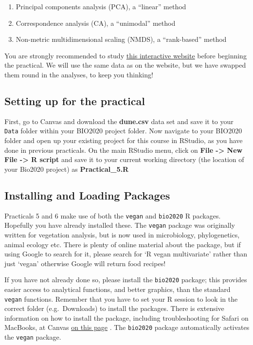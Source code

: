 \documentclass[
]{article}
\providecommand{\tightlist}{%
  \setlength{\itemsep}{0pt}\setlength{\parskip}{0pt}}
\begin{document}
\begin{enumerate}
\def\labelenumi{\arabic{enumi}.}
\tightlist
\item
  Principal components analysis (PCA), a ``linear'' method
\item
  Correspondence analysis (CA), a ``unimodal'' method
\item
  Non-metric multidimensional scaling (NMDS), a ``rank-based'' method
\end{enumerate}

You are strongly recommended to study
\href{https://naturalandenvironmentalscience.shinyapps.io/Unconstrained/}{this
interactive website} before beginning the practical. We will use the
same data as on the website, but we have swapped them round in the
analyses, to keep you thinking!

\hypertarget{setting-up-for-the-practical}{%
\subsection{Setting up for the
practical}\label{setting-up-for-the-practical}}

First, go to Canvas and download the \textbf{dune.csv} data set and save
it to your \texttt{Data} folder within your BIO2020 project folder. Now
navigate to your BIO2020 folder and open up your existing project for
this course in RStudio, as you have done in previous practicals. On the
main RStudio menu, click on \textbf{File -\textgreater{} New File
-\textgreater{} R script} and save it to your current working directory
(the location of your Bio2020 project) as \textbf{Practical\_5.R}

\hypertarget{installing-and-loading-packages}{%
\subsection{Installing and Loading
Packages}\label{installing-and-loading-packages}}

Practicals 5 and 6 make use of both the \texttt{vegan} and
\texttt{bio2020} R packages. Hopefully you have already installed these.
The \texttt{vegan} package was originally written for vegetation
analysis, but is now used in microbiology, phylogenetics, animal ecology
etc. There is plenty of online material about the package, but if using
Google to search for it, please search for `R vegan multivariate' rather
than just `vegan' otherwise Google will return food recipes!

If you have not already done so, please install the \texttt{bio2020}
package; this provides easier access to analytical functions, and better
graphics, than the standard \texttt{vegan} functions. Remember that you
have to set your R session to look in the correct folder
(e.g.~Downloads) to install the packages. There is extensive information
on how to install the package, including troubleshooting for Safari on
MacBooks, at Canvas
\href{https://ncl.instructure.com/courses/23926/pages/3-install-additional-r-packages}{on
this page} . The \texttt{bio2020} package automatically activates the
\texttt{vegan} package.
\end{document}
